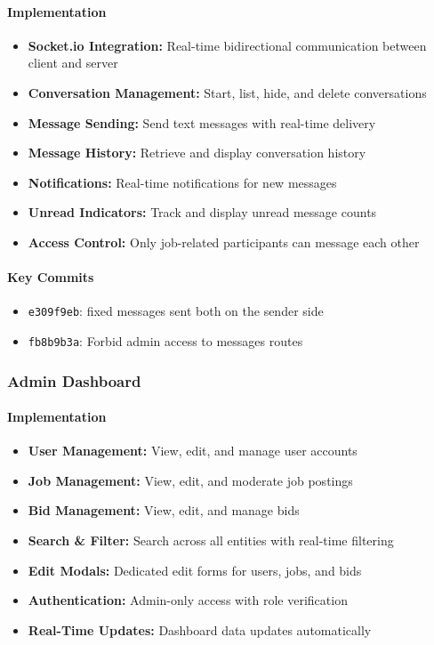 \documentclass[11pt]{article}
\begin{document}
\paragraph{Implementation}
\begin{itemize}[leftmargin=1.4em]
  \item \textbf{Socket.io Integration:} Real-time bidirectional communication between client and server
  \item \textbf{Conversation Management:} Start, list, hide, and delete conversations
  \item \textbf{Message Sending:} Send text messages with real-time delivery
  \item \textbf{Message History:} Retrieve and display conversation history
  \item \textbf{Notifications:} Real-time notifications for new messages
  \item \textbf{Unread Indicators:} Track and display unread message counts
  \item \textbf{Access Control:} Only job-related participants can message each other
\end{itemize}

\paragraph{Key Commits}
\begin{itemize}[leftmargin=1.4em]
  \item \texttt{e309f9eb}: fixed messages sent both on the sender side
  \item \texttt{fb8b9b3a}: Forbid admin access to messages routes
\end{itemize}

\subsubsection{Admin Dashboard}
\paragraph{Implementation}
\begin{itemize}[leftmargin=1.4em]
  \item \textbf{User Management:} View, edit, and manage user accounts
  \item \textbf{Job Management:} View, edit, and moderate job postings
  \item \textbf{Bid Management:} View, edit, and manage bids
  \item \textbf{Search \& Filter:} Search across all entities with real-time filtering
  \item \textbf{Edit Modals:} Dedicated edit forms for users, jobs, and bids
  \item \textbf{Authentication:} Admin-only access with role verification
  \item \textbf{Real-Time Updates:} Dashboard data updates automatically
\end{itemize}
\end{document}

